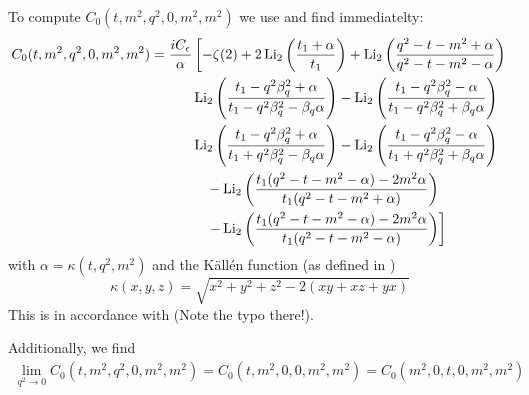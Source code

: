 To compute $C_0(t,m^2,q^2,0,m^2,m^2)$ we use \cite{Denner:2005nn} and find immediatelty:
\begin{align}
C_0(t,m^2,q^2,0,m^2,m^2) &= \frac{i C_\epsilon}{\alpha}\left[-\zeta(2)+2\operatorname{\text{Li}_2}\left(\frac{t_1+\alpha}{t_1}\right)+\operatorname{\text{Li}_2}\left(\frac{q^2-t-m^2+\alpha}{q^2-t-m^2-\alpha}\right)\right.\nonumber\\
&\hspace{30pt}\operatorname{\text{Li}_2}\left(\frac{t_1-q^2\beta_q^2+\alpha}{t_1-q^2\beta_q^2-\beta_q\alpha}\right)-\operatorname{\text{Li}_2}\left(\frac{t_1-q^2\beta_q^2-\alpha}{t_1-q^2\beta_q^2+\beta_q\alpha}\right)\nonumber\\
&\hspace{30pt}\operatorname{\text{Li}_2}\left(\frac{t_1-q^2\beta_q^2+\alpha}{t_1+q^2\beta_q^2-\beta_q\alpha}\right)-\operatorname{\text{Li}_2}\left(\frac{t_1-q^2\beta_q^2-\alpha}{t_1+q^2\beta_q^2+\beta_q\alpha}\right)\nonumber\\
&\hspace{40pt}-\operatorname{\text{Li}_2}\left(\frac{t_1(q^2-t-m^2-\alpha)-2m^2\alpha}{t_1(q^2-t-m^2+\alpha)}\right)\nonumber\\
&\hspace{40pt}\left.-\operatorname{\text{Li}_2}\left(\frac{t_1(q^2-t-m^2-\alpha)-2m^2\alpha}{t_1(q^2-t-m^2-\alpha)}\right)\right]
\end{align}
with $\alpha=\kappa(t,q^2,m^2)$ and the Källén function (as defined in \cite[eq. (4.27)]{Denner:2005nn})
\begin{equation}
\kappa(x,y,z)=\sqrt{x^2+y^2+z^2-2(xy+xz+yx)}
\end{equation}
This is in accordance with \cite[eq. (A.8)]{Laenen1993162}(Note the typo there!).

Additionally, we find
\begin{align}
\lim_{q^2\rightarrow 0}C_0(t,m^2,q^2,0,m^2,m^2) = C_0(t,m^2,0,0,m^2,m^2) = C_0(m^2,0,t,0,m^2,m^2)
\end{align}


